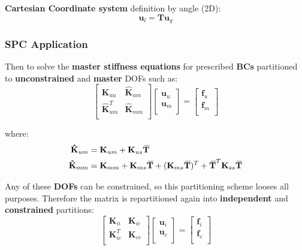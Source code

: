 \documentclass[10pt,b5paper,titlepage]{book}
\newcommand{\m}{\mathbf}
\newcommand{\closure}[2][3]{%
{}\mkern#1mu\overline{\mkern-#1mu#2}}
\newenvironment{eqarray}
{
    \begin{eqnarray}
        \begin{aligned}
}
{
        \end{aligned}
    \end{eqnarray}
}
\begin{document}
\textbf{Cartesian Coordinate system} definition by angle (2D):
\begin{equation}
    \m{u}_l = \m{T} \m{u}_g
\end{equation}


\subsubsection{SPC Application}

Then to solve the \textbf{master stiffness equations} for prescribed \textbf{BCs}
partitioned to \textbf{unconstrained} and \textbf{master} DOFs such as:
\begin{equation}
    \begin{bmatrix}
        \m{K}_{uu} & \m{\hat{K}}_{um} \\
        \m{\hat{K}}_{um}^T & \m{\hat{K}}_{mm} \\
    \end{bmatrix}
    \begin{bmatrix}
        \m{u}_u \\
        \m{u}_m \\
    \end{bmatrix}
    = \begin{bmatrix}
        \m{f}_{u} \\
        \m{f}_m \\
    \end{bmatrix}
\end{equation}

where:
\begin{eqarray}
    \m{\hat{K}}_{um} &= \m{K}_{um} + \m{K}_{us} \m{\closure{T}} \\
    \m{\hat{K}}_{mm} &= \m{K}_{mm} + \m{K}_{ms} \m{\closure{T}}
                      + (\m{K}_{ms} \m{\closure{T}})^T
                      + \m{\closure{T}}^T \m{K}_{ss} \m{\closure{T}}
\end{eqarray}

Any of these \textbf{DOFs} can be constrained, so this partitioning scheme looses
all purposes. Therefore the matrix is repartitioned again into
\textbf{independent} and \textbf{constrained} partitions:
\begin{equation}
    \begin{bmatrix}
        \m{K}_{ii} & \m{K}_{ic} \\
        \m{K}_{ic}^T & \m{K}_{cc} \\
    \end{bmatrix}
    \begin{bmatrix}
        \m{u}_i \\
        \m{u}_c \\
    \end{bmatrix}
    = \begin{bmatrix}
        \m{f}_{i} \\
        \m{f}_c \\
    \end{bmatrix}
\end{equation}
\end{document}
